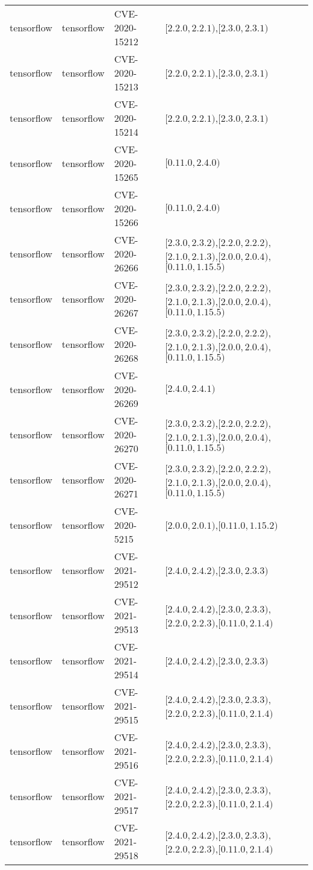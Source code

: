 \begin{tabular}{llll}
tensorflow & tensorflow & CVE-2020-15212 & $[2.2.0,2.2.1)$,$[2.3.0,2.3.1)$ \\
tensorflow & tensorflow & CVE-2020-15213 & $[2.2.0,2.2.1)$,$[2.3.0,2.3.1)$ \\
tensorflow & tensorflow & CVE-2020-15214 & $[2.2.0,2.2.1)$,$[2.3.0,2.3.1)$ \\
tensorflow & tensorflow & CVE-2020-15265 & $[0.11.0,2.4.0)$ \\
tensorflow & tensorflow & CVE-2020-15266 & $[0.11.0,2.4.0)$ \\
tensorflow & tensorflow & CVE-2020-26266 & $[2.3.0,2.3.2)$,$[2.2.0,2.2.2)$,$[2.1.0,2.1.3)$,$[2.0.0,2.0.4)$,$[0.11.0,1.15.5)$ \\
tensorflow & tensorflow & CVE-2020-26267 & $[2.3.0,2.3.2)$,$[2.2.0,2.2.2)$,$[2.1.0,2.1.3)$,$[2.0.0,2.0.4)$,$[0.11.0,1.15.5)$ \\
tensorflow & tensorflow & CVE-2020-26268 & $[2.3.0,2.3.2)$,$[2.2.0,2.2.2)$,$[2.1.0,2.1.3)$,$[2.0.0,2.0.4)$,$[0.11.0,1.15.5)$ \\
tensorflow & tensorflow & CVE-2020-26269 & $[2.4.0,2.4.1)$ \\
tensorflow & tensorflow & CVE-2020-26270 & $[2.3.0,2.3.2)$,$[2.2.0,2.2.2)$,$[2.1.0,2.1.3)$,$[2.0.0,2.0.4)$,$[0.11.0,1.15.5)$ \\
tensorflow & tensorflow & CVE-2020-26271 & $[2.3.0,2.3.2)$,$[2.2.0,2.2.2)$,$[2.1.0,2.1.3)$,$[2.0.0,2.0.4)$,$[0.11.0,1.15.5)$ \\
tensorflow & tensorflow & CVE-2020-5215 & $[2.0.0,2.0.1)$,$[0.11.0,1.15.2)$ \\
tensorflow & tensorflow & CVE-2021-29512 & $[2.4.0,2.4.2)$,$[2.3.0,2.3.3)$ \\
tensorflow & tensorflow & CVE-2021-29513 & $[2.4.0,2.4.2)$,$[2.3.0,2.3.3)$,$[2.2.0,2.2.3)$,$[0.11.0,2.1.4)$ \\
tensorflow & tensorflow & CVE-2021-29514 & $[2.4.0,2.4.2)$,$[2.3.0,2.3.3)$ \\
tensorflow & tensorflow & CVE-2021-29515 & $[2.4.0,2.4.2)$,$[2.3.0,2.3.3)$,$[2.2.0,2.2.3)$,$[0.11.0,2.1.4)$ \\
tensorflow & tensorflow & CVE-2021-29516 & $[2.4.0,2.4.2)$,$[2.3.0,2.3.3)$,$[2.2.0,2.2.3)$,$[0.11.0,2.1.4)$ \\
tensorflow & tensorflow & CVE-2021-29517 & $[2.4.0,2.4.2)$,$[2.3.0,2.3.3)$,$[2.2.0,2.2.3)$,$[0.11.0,2.1.4)$ \\
tensorflow & tensorflow & CVE-2021-29518 & $[2.4.0,2.4.2)$,$[2.3.0,2.3.3)$,$[2.2.0,2.2.3)$,$[0.11.0,2.1.4)$ \\

\end{tabular}

